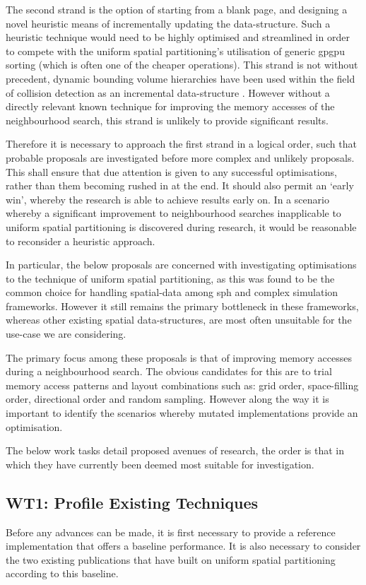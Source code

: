     The second strand is the option of starting from a blank page, and designing a novel heuristic means of incrementally updating the data-structure. Such a heuristic technique would need to be highly optimised and streamlined in order to compete with the uniform spatial partitioning's utilisation of generic \gls{gpgpu} sorting (which is often one of the cheaper operations). This strand is not without precedent, dynamic bounding volume hierarchies have been used within the field of collision detection as an incremental data-structure \cite{LA06,WBS07}. However without a directly relevant known technique for improving the memory accesses of the neighbourhood search, this strand is unlikely to provide significant results.
    
    Therefore it is necessary to approach the first strand in a logical order, such that probable proposals are investigated before more complex and unlikely proposals. This shall ensure that due attention is given to any successful optimisations, rather than them becoming rushed in at the end. It should also permit an `early win', whereby the research is able to achieve results early on. In a scenario whereby a significant improvement to neighbourhood searches inapplicable to uniform spatial partitioning is discovered during research, it would be reasonable to reconsider a heuristic approach.
    
    In particular, the below proposals are concerned with investigating optimisations to the technique of uniform spatial partitioning, as this was found to be the common choice for handling spatial-data among \gls{sph} and complex simulation frameworks. However it still remains the primary bottleneck in these frameworks, whereas other existing spatial data-structures, are most often unsuitable for the use-case we are considering.
    
    The primary focus among these proposals is that of improving memory accesses during a neighbourhood search. The obvious candidates for this are to trial memory access patterns and layout combinations such as: grid order, space-filling order, directional order and random sampling. However along the way it is important to identify the scenarios whereby mutated implementations provide an optimisation.
    
    The below work tasks detail proposed avenues of research, the order is that in which they have currently been deemed most suitable for investigation. 
    
    \subsection{WT1: Profile Existing Techniques}
      Before any advances can be made, it is first necessary to provide a reference implementation that offers a baseline performance. It is also necessary to consider the two existing publications that have built on uniform spatial partitioning according to this baseline.
    
